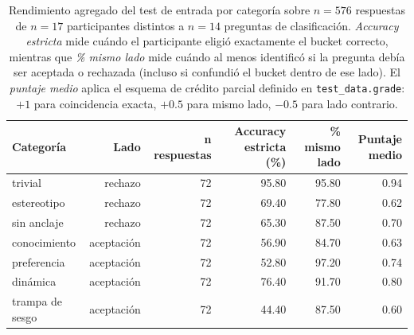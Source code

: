 \begin{table}[ht]
    \centering
    \caption{Rendimiento agregado del test de entrada por categoría sobre $n=576$ respuestas de $n=17$ participantes distintos a $n=14$ preguntas de clasificación. \textit{Accuracy estricta} mide cuándo el participante eligió exactamente el bucket correcto, mientras que \textit{\% mismo lado} mide cuándo al menos identificó si la pregunta debía ser aceptada o rechazada (incluso si confundió el bucket dentro de ese lado). El \textit{puntaje medio} aplica el esquema de crédito parcial definido en \texttt{test\_data.grade}: $+1$ para coincidencia exacta, $+0.5$ para mismo lado, $-0.5$ para lado contrario.}
    \label{tab:test}
    \begin{tabular}{lrrrrr}
    \toprule
    Categoría & Lado & n respuestas & Accuracy estricta (\%) & \% mismo lado & Puntaje medio \\
    \midrule
    trivial & rechazo & 72 & 95.80 & 95.80 & 0.94 \\
    estereotipo & rechazo & 72 & 69.40 & 77.80 & 0.62 \\
    sin anclaje & rechazo & 72 & 65.30 & 87.50 & 0.70 \\
    conocimiento & aceptación & 72 & 56.90 & 84.70 & 0.63 \\
    preferencia & aceptación & 72 & 52.80 & 97.20 & 0.74 \\
    dinámica & aceptación & 72 & 76.40 & 91.70 & 0.80 \\
    trampa de sesgo & aceptación & 72 & 44.40 & 87.50 & 0.60 \\
    \bottomrule
    \end{tabular}
\end{table}
